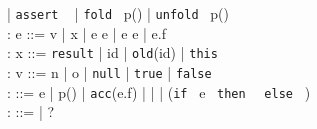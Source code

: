 \documentclass {article}
\newcommand{\code}{\texttt} %
\newcommand{\tphi}{\widetilde{\phi}}
\begin{document}
\begin{figure}[ht!]
\begin{plstx}
                         | \code{assert} \ \phi
                         | \code{fold} \ p()
                         | \code{unfold} \ p()
                         \\
: e                 ::= v | x | e \oplus e | e \odot e | e.f \\
: x                 ::= \code{result} | id | \code{old}(id) | \code{this} \\
: v                 ::= n | o | \code{null} | \code{true} | \code{false} \\
: \phi              ::= e | p() | \code{acc}(e.f) | \phi \land \phi | \phi * \phi
                        | (\code{if} \ e \ \code{then} \ \phi \ \code{else} \ \phi)
                        \\
: \tphi             ::= \phi | ? \ast \phi \\
\end{plstx}
\end{figure}
\end{document}
